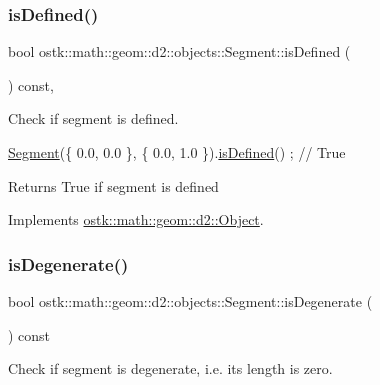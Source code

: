 \subsubsection{\texorpdfstring{is\+Defined()}{isDefined()}}
{\footnotesize\ttfamily bool ostk\+::math\+::geom\+::d2\+::objects\+::\+Segment\+::is\+Defined (\begin{DoxyParamCaption}{ }\end{DoxyParamCaption}) const\hspace{0.3cm}{\ttfamily [override]}, {\ttfamily [virtual]}}



Check if segment is defined. 


\begin{DoxyCode}
\hyperlink{classostk_1_1math_1_1geom_1_1d2_1_1objects_1_1_segment_a56c91f22315d7cefe9d5e9973330028d}{Segment}(\{ 0.0, 0.0 \}, \{ 0.0, 1.0 \}).\hyperlink{classostk_1_1math_1_1geom_1_1d2_1_1objects_1_1_segment_a4e7397f14fd36b0aecd7afddd4fddf84}{isDefined}() ; \textcolor{comment}{// True}
\end{DoxyCode}


\begin{DoxyReturn}{Returns}
True if segment is defined 
\end{DoxyReturn}


Implements \hyperlink{classostk_1_1math_1_1geom_1_1d2_1_1_object_a456cc7121218d24c1322d0fe54230cc4}{ostk\+::math\+::geom\+::d2\+::\+Object}.

\mbox{\label{classostk_1_1math_1_1geom_1_1d2_1_1objects_1_1_segment_a35a46e06daf7d791b0069641cf684f91}} 
\subsubsection{\texorpdfstring{is\+Degenerate()}{isDegenerate()}}
{\footnotesize\ttfamily bool ostk\+::math\+::geom\+::d2\+::objects\+::\+Segment\+::is\+Degenerate (\begin{DoxyParamCaption}{ }\end{DoxyParamCaption}) const}



Check if segment is degenerate, i.\+e. its length is zero. 


